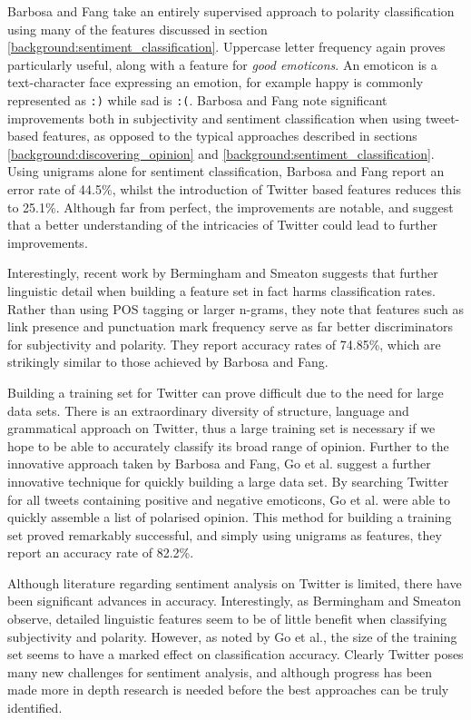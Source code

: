 Barbosa and Fang take an entirely supervised approach to polarity classification using many of the features discussed in section \ref{background:sentiment_classification}. Uppercase letter frequency again proves particularly useful, along with a feature for \emph{good emoticons}. An emoticon is a text-character face expressing an emotion, for example happy is commonly represented as \texttt{:)} while sad is \texttt{:(}. Barbosa and Fang note significant improvements both in subjectivity and sentiment classification when using tweet-based features, as opposed to the typical approaches described in sections \ref{background:discovering_opinion} and \ref{background:sentiment_classification}. Using unigrams alone for sentiment classification, Barbosa and Fang report an error rate of 44.5\%, whilst the introduction of Twitter based features reduces this to 25.1\%. Although far from perfect, the improvements are notable, and suggest that a better understanding of the intricacies of Twitter could lead to further improvements.

Interestingly, recent work by Bermingham and Smeaton \cite{Bermingham:2010vh} suggests that further linguistic detail when building a feature set in fact harms classification rates. Rather than using POS tagging or larger n-grams, they note that features such as link presence and punctuation mark frequency serve as far better discriminators for subjectivity and polarity. They report accuracy rates of 74.85\%, which are strikingly similar to those achieved by Barbosa and Fang. 

Building a training set for Twitter can prove difficult due to the need for large data sets. There is an extraordinary diversity of structure, language and grammatical approach on Twitter, thus a large training set is necessary if we hope to be able to accurately classify its broad range of opinion. Further to the innovative approach taken by Barbosa and Fang, Go et al. \cite{Go:2009ut} suggest a further innovative technique for quickly building a large data set. By searching Twitter for all tweets containing positive and negative emoticons, Go et al. were able to quickly assemble a list of polarised opinion. This method for building a training set proved remarkably successful, and simply using unigrams as features, they report an accuracy rate of 82.2\%. 

Although literature regarding sentiment analysis on Twitter is limited, there have been significant advances in accuracy. Interestingly, as Bermingham and Smeaton observe, detailed linguistic features seem to be of little benefit when classifying subjectivity and polarity. However, as noted by Go et al., the size of the training set seems to have a marked effect on classification accuracy. Clearly Twitter poses many new challenges for sentiment analysis, and although progress has been made more in depth research is needed before the best approaches can be truly identified.


